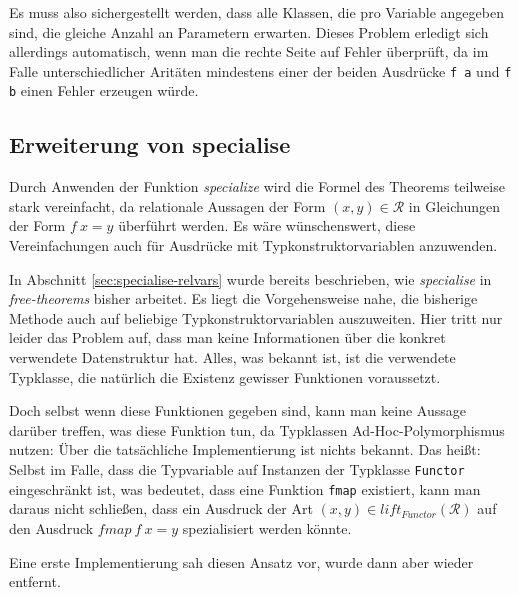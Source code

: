 Es muss also sichergestellt werden, dass alle Klassen, die pro Variable angegeben sind, die gleiche Anzahl an Parametern erwarten.
Dieses Problem erledigt sich allerdings automatisch, wenn man die rechte Seite auf Fehler überprüft, da im Falle unterschiedlicher
Aritäten mindestens einer der beiden Ausdrücke \texttt{f a} und \texttt{f b} einen Fehler erzeugen würde.


\subsection{Erweiterung von specialise}

Durch Anwenden der Funktion \textit{specialize} wird die Formel des Theorems teilweise stark vereinfacht, da relationale
Aussagen der Form $(x, y) \in \mathcal{R}$ in Gleichungen der Form $f\ x = y$ überführt werden. Es wäre wünschenswert,
diese Vereinfachungen auch für Ausdrücke mit Typkonstruktorvariablen anzuwenden.

In Abschnitt \ref{sec:specialise-relvars} wurde bereits beschrieben, wie \textit{specialise} in \textit{free-theorems} bisher arbeitet.
Es liegt die Vorgehensweise nahe, die bisherige Methode auch auf beliebige Typkonstruktorvariablen auszuweiten. Hier tritt nur leider
das Problem auf, dass man keine Informationen über die konkret verwendete Datenstruktur hat. Alles, was bekannt ist, ist die
verwendete Typklasse, die natürlich die Existenz gewisser Funktionen voraussetzt.

Doch selbst wenn diese Funktionen gegeben sind, kann man keine Aussage darüber treffen, was diese Funktion tun, da Typklassen
Ad-Hoc-Polymorphismus nutzen: Über die tatsächliche Implementierung ist nichts bekannt. Das heißt: Selbst im Falle, dass
die Typvariable auf Instanzen der Typklasse \texttt{Functor} eingeschränkt ist, was bedeutet, dass eine Funktion \texttt{fmap}
existiert, kann man daraus nicht schließen, dass ein Ausdruck der Art $(x, y) \in lift_{Functor}(\mathcal{R})$ auf den Ausdruck
$fmap\ f\ x = y$ spezialisiert werden könnte.

Eine erste Implementierung sah diesen Ansatz vor, wurde dann aber wieder entfernt.


